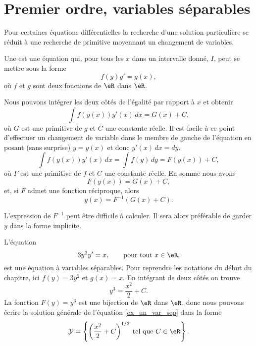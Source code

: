 \section{Premier ordre, variables séparables}

Pour certaines équations différentielles la recherche d'une solution particulière se réduit à une recherche de primitive moyennant un changement de variables.
\begin{definition}
	Une   est une équation qui, pour tous les \(x\) dans un intervalle donné, \(I\), peut se mettre sous la forme
	\begin{equation}\label{eq_var_sep}
		f(y)y' = g(x),
	\end{equation}
	o\`u \(f\) et \(g\) sont deux fonctions de \(\eR\) dans \(\eR\).
\end{definition}
Nous pouvons intégrer les deux côtés de l'égalité par rapport à \(x\) et obtenir
\[
	\int f(y(x))y'(x)\, dx = G(x)+C,
\]
o\`u \( G\) est une primitive de \( g\) et \( C\) une constante réelle. Il est facile \`a ce point d'effectuer un changement de variable dans le membre de gauche de l'équation en posant (sans surprise) \(y= y(x)\) et donc \(y'(x)\,dx = dy\).
\[
	\int f(y(x))y'(x)\, dx =  \int f(y)\, dy  = F(y(x)) + C ,
\]
o\`u \( F\) est une primitive de \( f\) et \( C\) une constante réelle. En somme nous avons
\[
	F(y(x)) = G(x) + C ,
\]
et, si \( F\) admet une fonction réciproque, alors
\begin{equation}
	y(x) = F^{-1} (G(x)+C).
\end{equation}
\begin{remark}
	L'expression de \( F^{-1} \) peut être difficile à calculer. Il sera alors préférable de garder \( y\) dans la forme implicite.
\end{remark}

\begin{example}
	L'équation
	\begin{equation}\label{ex_un_var_sep}
		3y^2 y' = x, \qquad\text{pour tout } x\in\eR,
	\end{equation}
	est une équation à variables séparables. Pour reprendre les notations du début du chapitre, ici \(f(y) = 3y^2\) et \(g(x) = x\). En intégrant de deux côtés on trouve
	\[
		y^3 = \frac{x^2}{2} + C .
	\]
	La fonction \( F(y) = y^3\) est une bijection de \( \eR\) dans \( \eR\), donc nous pouvons écrire la solution générale de l'équation \eqref{ex_un_var_sep} dans la forme
	\[
		\mathcal{Y} =\left\{ \left(\frac{x^2}{2} + C \right)^{1/3} \:\text{tel que } C\in\eR\right\}.
	\]
\end{example}

